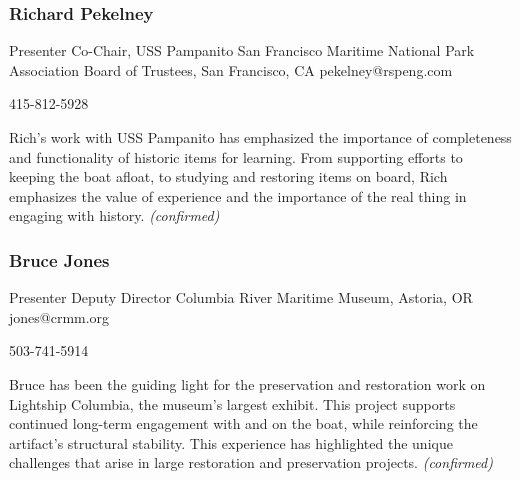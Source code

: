 \documentclass{report}
\begin{document}
              
                \subsubsection*{ Richard Pekelney }
                Presenter\newline
                Co-Chair, USS Pampanito\newline
                San Francisco Maritime National Park Association Board of Trustees, San Francisco, CA
                \newline
                pekelney@rspeng.com\newline
                
                415-812-5928\newline

                Rich's work with USS Pampanito has emphasized the importance of completeness and functionality of historic items for learning. From supporting efforts to keeping the boat afloat, to studying and restoring items on board, Rich emphasizes the value of experience and the importance of the real thing in engaging with history.
                \emph{ (confirmed) }
              

              
                \subsubsection*{ Bruce Jones }
                Presenter\newline
                Deputy Director\newline
                Columbia River Maritime Museum, Astoria, OR
                \newline
                jones@crmm.org\newline
                
                503-741-5914\newline

                Bruce has been the guiding light for the preservation and restoration work on Lightship Columbia, the museum's largest exhibit. This project supports continued long-term engagement with and on the boat, while reinforcing the artifact's structural stability. This experience has highlighted the unique challenges that arise in large restoration and preservation projects.
                \emph{ (confirmed) }
              

              
\end{document}
